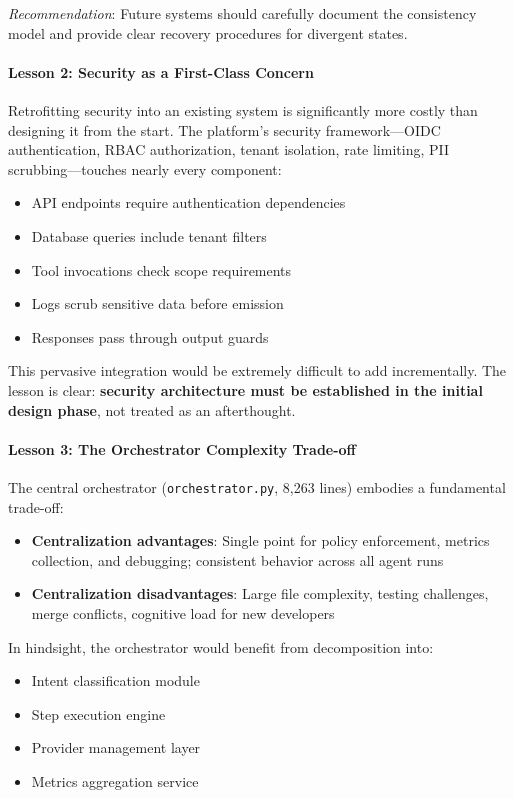\textit{Recommendation}: Future systems should carefully document the consistency model and provide clear recovery procedures for divergent states.

\paragraph{Lesson 2: Security as a First-Class Concern}

Retrofitting security into an existing system is significantly more costly than designing it from the start. The platform's security framework---OIDC authentication, RBAC authorization, tenant isolation, rate limiting, PII scrubbing---touches nearly every component:

\begin{itemize}
    \item API endpoints require authentication dependencies
    \item Database queries include tenant filters
    \item Tool invocations check scope requirements
    \item Logs scrub sensitive data before emission
    \item Responses pass through output guards
\end{itemize}

This pervasive integration would be extremely difficult to add incrementally. The lesson is clear: \textbf{security architecture must be established in the initial design phase}, not treated as an afterthought.

\paragraph{Lesson 3: The Orchestrator Complexity Trade-off}

The central orchestrator (\texttt{orchestrator.py}, 8,263 lines) embodies a fundamental trade-off:

\begin{itemize}
    \item \textbf{Centralization advantages}: Single point for policy enforcement, metrics collection, and debugging; consistent behavior across all agent runs
    \item \textbf{Centralization disadvantages}: Large file complexity, testing challenges, merge conflicts, cognitive load for new developers
\end{itemize}

In hindsight, the orchestrator would benefit from decomposition into:
\begin{itemize}
    \item Intent classification module
    \item Step execution engine
    \item Provider management layer
    \item Metrics aggregation service
\end{itemize}

